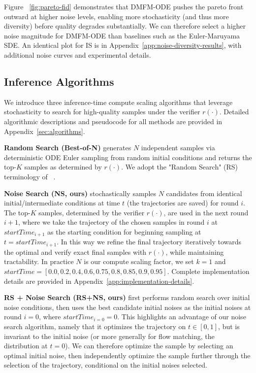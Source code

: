 \documentclass{article} %
\begin{document}
Figure ~\ref{fig:pareto-fid} demonstrates that DMFM-ODE pushes the pareto front outward at higher noise levels, enabling more stochasticity (and thus more diversity) before quality degrades substantially. We can therefore select a higher noise magnitude for DMFM-ODE than baselines such as the Euler-Maruyama SDE. An identical plot for IS is in Appendix~\ref{app:noise-diversity-results}, with additional noise curves and experimental details.

\subsection{Inference Algorithms}

We introduce three inference-time compute scaling algorithms that leverage stochasticity to search for high-quality samples under the verifier $r(\cdot)$. Detailed algorithmic descriptions and pseudocode for all methods are provided in Appendix~\ref{sec:algorithms}.

\textbf{Random Search (Best-of-N)} generates $N$ independent samples via deterministic ODE Euler sampling from random initial conditions and returns the top-$K$ samples as determined by $r(\cdot)$. We adopt the "Random Search" (RS) terminology of ~\cite{ma2025diffits}. 

\textbf{Noise Search (NS, ours)} stochastically samples $N$ candidates from identical initial/intermediate conditions at time $t$ (the trajectories are saved) for round $i$. The top-$K$ samples, determined by the verifier $r(\cdot)$, are used in the next round $i+1$, where we take the trajectory of the chosen samples in round $i$ at $startTime_{i+1}$ as the starting condition for beginning sampling at $t=startTime_{i+1}$. In this way we refine the final trajectory iteratively towards the optimal and verify exact final samples with $r(\cdot)$, while maintaining tractability. In practice $N$ is our compute scaling factor, we set $k=1$ and $startTime=[0.0, 0.2, 0.4, 0.6, 0.75, 0.8, 0.85, 0.9, 0.95]$. Complete implementation details are provided in Appendix~\ref{app:implementation-details}.

\textbf{RS + Noise Search (RS+NS, ours)} first performs random search over initial noise conditions, then uses the best candidate initial noises as the initial noises at round $i=0$, where $startTime_{i=0}=0$. This highlights an advantage of our noise search algorithm, namely that it optimizes the trajectory on $t \in [0,1]$, but is invariant to the initial noise (or more generally for flow matching, the distribution at $t=0$). We can therefore optimize the sample by selecting an optimal initial noise, then independently optimize the sample further through the selection of the trajectory, conditional on the initial noises selected.
\end{document}

